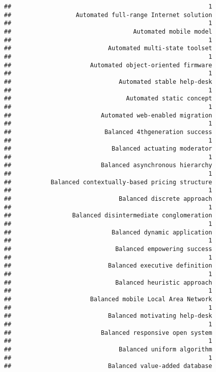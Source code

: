 \documentclass[
]{article}
\begin{document}
\begin{verbatim}
##                                                       1 
##                  Automated full-range Internet solution 
##                                                       1 
##                                  Automated mobile model 
##                                                       1 
##                           Automated multi-state toolset 
##                                                       1 
##                      Automated object-oriented firmware 
##                                                       1 
##                              Automated stable help-desk 
##                                                       1 
##                                Automated static concept 
##                                                       1 
##                         Automated web-enabled migration 
##                                                       1 
##                          Balanced 4thgeneration success 
##                                                       1 
##                            Balanced actuating moderator 
##                                                       1 
##                         Balanced asynchronous hierarchy 
##                                                       1 
##           Balanced contextually-based pricing structure 
##                                                       1 
##                              Balanced discrete approach 
##                                                       1 
##                 Balanced disintermediate conglomeration 
##                                                       1 
##                            Balanced dynamic application 
##                                                       1 
##                             Balanced empowering success 
##                                                       1 
##                           Balanced executive definition 
##                                                       1 
##                             Balanced heuristic approach 
##                                                       1 
##                      Balanced mobile Local Area Network 
##                                                       1 
##                           Balanced motivating help-desk 
##                                                       1 
##                         Balanced responsive open system 
##                                                       1 
##                              Balanced uniform algorithm 
##                                                       1 
##                           Balanced value-added database 

\end{verbatim}
\end{document}
